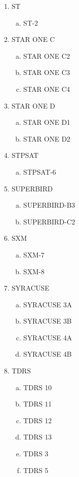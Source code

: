 \begin{multicols}{2}
\begin{enumerate}
  \item ST
  \begin{enumerate}[a.]
    \item ST-2
  \end{enumerate}
  \item STAR ONE C
  \begin{enumerate}[a.]
    \item STAR ONE C2
    \item STAR ONE C3
    \item STAR ONE C4
  \end{enumerate}
  \item STAR ONE D
  \begin{enumerate}[a.]
    \item STAR ONE D1
    \item STAR ONE D2
  \end{enumerate}
  \item STPSAT
  \begin{enumerate}[a.]
    \item STPSAT-6
  \end{enumerate}
  \item SUPERBIRD
  \begin{enumerate}[a.]
    \item SUPERBIRD-B3
    \item SUPERBIRD-C2
  \end{enumerate}
  \item SXM
  \begin{enumerate}[a.]
    \item SXM-7
    \item SXM-8
  \end{enumerate}
  \item SYRACUSE
  \begin{enumerate}[a.]
    \item SYRACUSE 3A
    \item SYRACUSE 3B
    \item SYRACUSE 4A
    \item SYRACUSE 4B
  \end{enumerate}
  \item TDRS
  \begin{enumerate}[a.]
    \item TDRS 10
    \item TDRS 11
    \item TDRS 12
    \item TDRS 13
    \item TDRS 3
    \item TDRS 5

\end{enumerate}
\end{enumerate}
\end{multicols}
